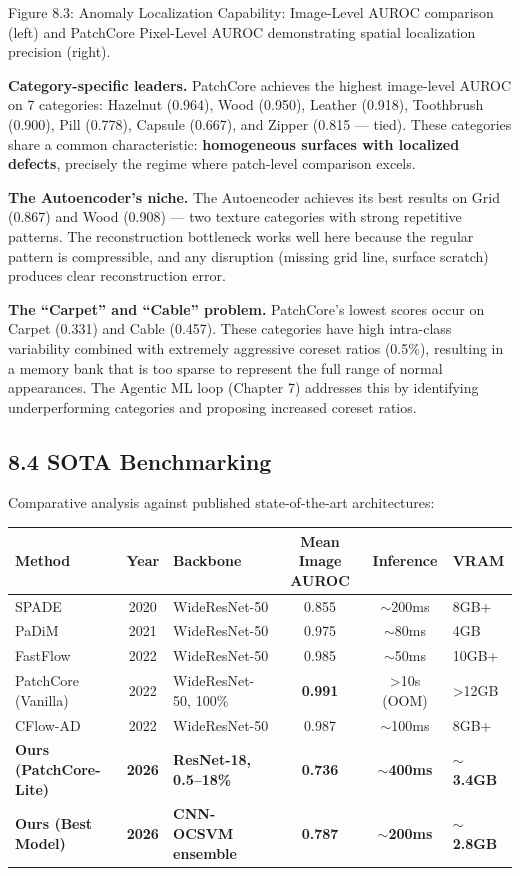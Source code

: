 \documentclass[12pt, a4paper, oneside]{report}
\begin{document}
Figure 8.3: Anomaly Localization Capability: Image-Level AUROC comparison (left) and PatchCore Pixel-Level AUROC demonstrating spatial localization precision (right).

\textbf{Category-specific leaders.} PatchCore achieves the highest image-level AUROC on 7 categories: Hazelnut (0.964), Wood (0.950), Leather (0.918), Toothbrush (0.900), Pill (0.778), Capsule (0.667), and Zipper (0.815 --- tied). These categories share a common characteristic: \textbf{homogeneous surfaces with localized defects}, precisely the regime where patch-level comparison excels.

\textbf{The Autoencoder's niche.} The Autoencoder achieves its best results on Grid (0.867) and Wood (0.908) --- two texture categories with strong repetitive patterns. The reconstruction bottleneck works well here because the regular pattern is compressible, and any disruption (missing grid line, surface scratch) produces clear reconstruction error.

\textbf{The ``Carpet'' and ``Cable'' problem.} PatchCore's lowest scores occur on Carpet (0.331) and Cable (0.457). These categories have high intra-class variability combined with extremely aggressive coreset ratios (0.5\%), resulting in a memory bank that is too sparse to represent the full range of normal appearances. The Agentic ML loop (Chapter 7) addresses this by identifying underperforming categories and proposing increased coreset ratios.

\bigskip\noindent\hrulefill\bigskip

\subsection{8.4 SOTA Benchmarking}\label{sota-benchmarking}

Comparative analysis against published state-of-the-art architectures:

{\def\LTcaptype{none} %
\begin{longtable}[]{@{}lclccl@{}}
\toprule\noalign{}
Method & Year & Backbone & Mean Image AUROC & Inference & VRAM \\
\midrule\noalign{}
\endhead
\bottomrule\noalign{}
\endlastfoot
SPADE & 2020 & WideResNet-50 & 0.855 & ${\sim}$200ms & 8GB+ \\
PaDiM & 2021 & WideResNet-50 & 0.975 & ${\sim}$80ms & 4GB \\
FastFlow & 2022 & WideResNet-50 & 0.985 & ${\sim}$50ms & 10GB+ \\
PatchCore (Vanilla) & 2022 & WideResNet-50, 100\% & \textbf{0.991} & \textgreater10s (OOM) & \textgreater12GB \\
CFlow-AD & 2022 & WideResNet-50 & 0.987 & ${\sim}$100ms & 8GB+ \\
\textbf{Ours (PatchCore-Lite)} & \textbf{2026} & \textbf{ResNet-18, 0.5--18\%} & \textbf{0.736} & \textbf{${\sim}$400ms} & \textbf{${\sim}$3.4GB} \\
\textbf{Ours (Best Model)} & \textbf{2026} & \textbf{CNN-OCSVM ensemble} & \textbf{0.787} & \textbf{${\sim}$200ms} & \textbf{${\sim}$2.8GB} \\
\end{longtable}
}
\end{document}
